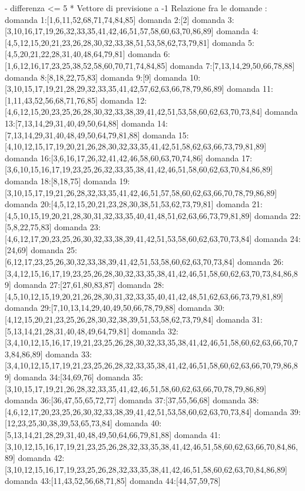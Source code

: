 - differenza <= 5
* Vettore di previsione a -1
Relazione fra le domande :
domanda 1:[1,6,11,52,68,71,74,84,85]
domanda 2:[2]
domanda 3:[3,10,16,17,19,26,32,33,35,41,42,46,51,57,58,60,63,70,86,89]
domanda 4:[4,5,12,15,20,21,23,26,28,30,32,33,38,51,53,58,62,73,79,81]
domanda 5:[4,5,20,21,22,28,31,40,48,64,79,81]
domanda 6:[1,6,12,16,17,23,25,38,52,58,60,70,71,74,84,85]
domanda 7:[7,13,14,29,50,66,78,88]
domanda 8:[8,18,22,75,83]
domanda 9:[9]
domanda 10:[3,10,15,17,19,21,28,29,32,33,35,41,42,57,62,63,66,78,79,86,89]
domanda 11:[1,11,43,52,56,68,71,76,85]
domanda 12:[4,6,12,15,20,23,25,26,28,30,32,33,38,39,41,42,51,53,58,60,62,63,70,73,84]
domanda 13:[7,13,14,29,31,40,49,50,64,88]
domanda 14:[7,13,14,29,31,40,48,49,50,64,79,81,88]
domanda 15:[4,10,12,15,17,19,20,21,26,28,30,32,33,35,41,42,51,58,62,63,66,73,79,81,89]
domanda 16:[3,6,16,17,26,32,41,42,46,58,60,63,70,74,86]
domanda 17:[3,6,10,15,16,17,19,23,25,26,32,33,35,38,41,42,46,51,58,60,62,63,70,84,86,89]
domanda 18:[8,18,75]
domanda 19:[3,10,15,17,19,21,26,28,32,33,35,41,42,46,51,57,58,60,62,63,66,70,78,79,86,89]
domanda 20:[4,5,12,15,20,21,23,28,30,38,51,53,62,73,79,81]
domanda 21:[4,5,10,15,19,20,21,28,30,31,32,33,35,40,41,48,51,62,63,66,73,79,81,89]
domanda 22:[5,8,22,75,83]
domanda 23:[4,6,12,17,20,23,25,26,30,32,33,38,39,41,42,51,53,58,60,62,63,70,73,84]
domanda 24:[24,69]
domanda 25:[6,12,17,23,25,26,30,32,33,38,39,41,42,51,53,58,60,62,63,70,73,84]
domanda 26:[3,4,12,15,16,17,19,23,25,26,28,30,32,33,35,38,41,42,46,51,58,60,62,63,70,73,84,86,89]
domanda 27:[27,61,80,83,87]
domanda 28:[4,5,10,12,15,19,20,21,26,28,30,31,32,33,35,40,41,42,48,51,62,63,66,73,79,81,89]
domanda 29:[7,10,13,14,29,40,49,50,66,78,79,88]
domanda 30:[4,12,15,20,21,23,25,26,28,30,32,38,39,51,53,58,62,73,79,84]
domanda 31:[5,13,14,21,28,31,40,48,49,64,79,81]
domanda 32:[3,4,10,12,15,16,17,19,21,23,25,26,28,30,32,33,35,38,41,42,46,51,58,60,62,63,66,70,73,84,86,89]
domanda 33:[3,4,10,12,15,17,19,21,23,25,26,28,32,33,35,38,41,42,46,51,58,60,62,63,66,70,79,86,89]
domanda 34:[34,69,76]
domanda 35:[3,10,15,17,19,21,26,28,32,33,35,41,42,46,51,58,60,62,63,66,70,78,79,86,89]
domanda 36:[36,47,55,65,72,77]
domanda 37:[37,55,56,68]
domanda 38:[4,6,12,17,20,23,25,26,30,32,33,38,39,41,42,51,53,58,60,62,63,70,73,84]
domanda 39:[12,23,25,30,38,39,53,65,73,84]
domanda 40:[5,13,14,21,28,29,31,40,48,49,50,64,66,79,81,88]
domanda 41:[3,10,12,15,16,17,19,21,23,25,26,28,32,33,35,38,41,42,46,51,58,60,62,63,66,70,84,86,89]
domanda 42:[3,10,12,15,16,17,19,23,25,26,28,32,33,35,38,41,42,46,51,58,60,62,63,70,84,86,89]
domanda 43:[11,43,52,56,68,71,85]
domanda 44:[44,57,59,78]
